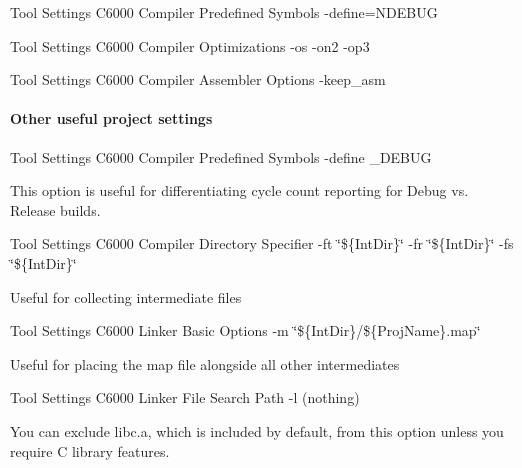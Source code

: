  Tool Settings   C6000 Compiler   Predefined Symbols   {\ttfamily -\/define=N\+D\+E\+B\+U\+G}

 Tool Settings   C6000 Compiler   Optimizations   {\ttfamily -\/os}  {\ttfamily -\/on2}  {\ttfamily -\/op3}

 Tool Settings   C6000 Compiler   Assembler Options   {\ttfamily -\/keep\+\_\+asm} 

\hypertarget{a00362_subsubsection__other_useful_project_settings_}{}\paragraph{Other useful project settings}\label{a00362_subsubsection__other_useful_project_settings_}
  Tool Settings   C6000 Compiler   Predefined Symbols   {\ttfamily -\/define \+\_\+\+D\+E\+B\+U\+G}

This option is useful for differentiating cycle count reporting for Debug vs. Release builds.

 Tool Settings   C6000 Compiler   Directory Specifier   {\ttfamily -\/ft \char`\"{}\$\{\+Int\+Dir\}\char`\"{}}  {\ttfamily -\/fr \char`\"{}\$\{\+Int\+Dir\}\char`\"{}}  {\ttfamily -\/fs \char`\"{}\$\{\+Int\+Dir\}\char`\"{}}

Useful for collecting intermediate files

 Tool Settings   C6000 Linker   Basic Options   {\ttfamily -\/m \char`\"{}\$\{\+Int\+Dir\}/\$\{\+Proj\+Name\}.\+map\char`\"{}}

Useful for placing the map file alongside all other intermediates

 Tool Settings   C6000 Linker   File Search Path   {\ttfamily -\/l (nothing)}

You can exclude libc.\+a, which is included by default, from this option unless you require C library features.

